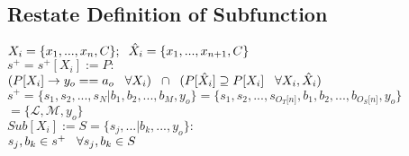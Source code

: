\documentclass[11pt]{article}
\begin{document}
\subsection{Restate Definition of Subfunction}
\vspace{2mm}
\begin{center}
$
X_i = \{x_1,...,x_n,C\}; \hspace{2mm} \hat{X}_i = \{x_1,...,x_{n+1},C\}
$
\\ \vspace{2mm}
$
s^+ = s^+[X_i] := P :
$
\\ \vspace{2mm}
$
(P \lbrack X_i \rbrack \rightarrow y_{o} == a_{o} \hspace{3mm} \forall X_i) \hspace{2mm} \cap \hspace{2mm} (P[\hat{X}_i] \supseteq P[X_i] \hspace{3mm} \forall X_i,\hat{X}_i)
$
\\ \vspace{4mm}
$
s^+ = \{ s_1,s_2,...,s_N|b_1,b_2,...,b_M,y_o\} = \{ s_1,s_2,...,s_{O_T \lbrack n \rbrack }, b_1, b_2,...,b_{O_S \lbrack n \rbrack},y_o \}
$
\\ \vspace{2mm}
$
= \{ \mathcal{L},\mathcal{M},y_o\}
$
\\ \vspace{6mm}
$
Sub[X_i] := S = \{s_j,...|b_k,...,y_o\}:
$
\\ \vspace{2mm}
$
s_j,b_k \in s^+ \hspace{3mm} \forall s_j,b_k \in S
$
\end{center}
\end{document}
